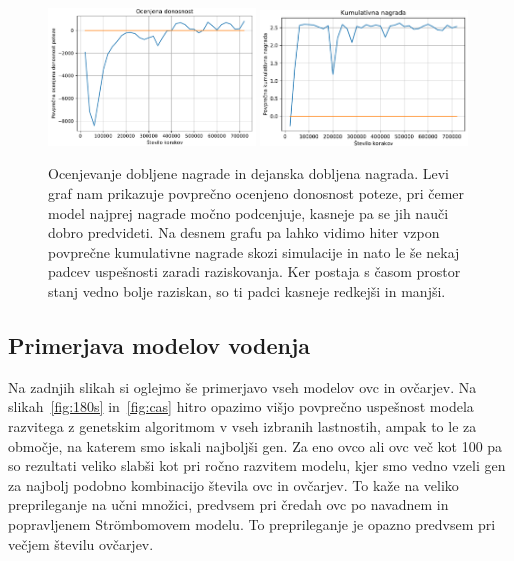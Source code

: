 \begin{figure}[H]  %
	\centering
	\includegraphics[width=0.49\textwidth]{../poglavja/grafi/donosnostAI2.pdf} \includegraphics[width=0.49\textwidth]{../poglavja/grafi/nagradeAI2.pdf}
	\caption[Ocenjevanje dobljene nagrade in dejanska dobljena nagrada]{Ocenjevanje dobljene nagrade in dejanska dobljena nagrada. Levi graf nam prikazuje povprečno ocenjeno donosnost poteze, pri čemer model najprej nagrade močno podcenjuje, kasneje pa se jih nauči dobro predvideti. Na desnem grafu pa lahko vidimo hiter vzpon povprečne kumulativne nagrade skozi simulacije in nato le še nekaj padcev uspešnosti zaradi raziskovanja. Ker postaja s časom prostor stanj vedno bolje raziskan, so ti padci kasneje redkejši in manjši.} %
	\label{fig:donosnost-nagrade}
\end{figure}

\subsection{Primerjava modelov vodenja}

Na zadnjih slikah si oglejmo še primerjavo vseh modelov ovc in ovčarjev. Na slikah~\ref{fig:180s} in~\ref{fig:cas} hitro opazimo višjo povprečno uspešnost modela razvitega z genetskim algoritmom v vseh izbranih lastnostih, ampak to le za območje, na katerem smo iskali najboljši gen. Za eno ovco ali ovc več kot 100 pa so rezultati veliko slabši kot pri ročno razvitem modelu, kjer smo vedno vzeli gen za najbolj podobno kombinacijo števila ovc in ovčarjev. To kaže na veliko preprileganje na učni množici, predvsem pri čredah ovc po navadnem in popravljenem Str{\"o}mbomovem modelu. To preprileganje je opazno predvsem pri večjem številu ovčarjev.

